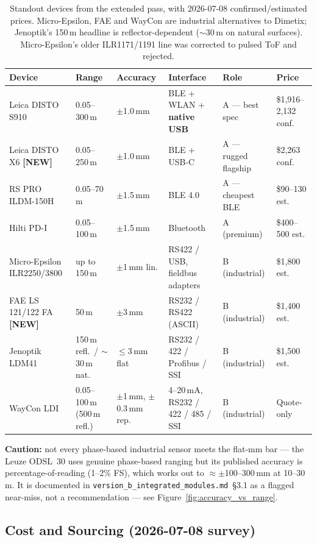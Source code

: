 \documentclass[11pt]{article}
\begin{document}
\begin{table}[htbp]
\centering
\small
\begin{tabular}{@{}p{2.4cm}p{1.7cm}p{1.4cm}p{2.8cm}p{2.0cm}p{2.0cm}@{}}
\toprule
\textbf{Device} & \textbf{Range} & \textbf{Accuracy} & \textbf{Interface} & \textbf{Role} & \textbf{Price} \\
\midrule
Leica DISTO S910 & 0.05--300\,m & $\pm$1.0\,mm & BLE + WLAN + \textbf{native USB} & A --- best spec & \$1{,}916--2{,}132 conf. \\
Leica DISTO X6 \textbf{[NEW]} & 0.05--250\,m & $\pm$1.0\,mm & BLE + USB-C & A --- rugged flagship & \$2{,}263 conf. \\
RS PRO ILDM-150H & 0.05--70\,m & $\pm$1.5\,mm & BLE 4.0 & A --- cheapest BLE & \$90--130 est. \\
Hilti PD-I & 0.05--100\,m & $\pm$1.5\,mm & Bluetooth & A (premium) & \$400--500 est. \\
Micro-Epsilon ILR2250/3800 & up to 150\,m & $\pm$1\,mm lin. & RS422 / USB, fieldbus adapters & B (industrial) & \$1{,}800 est. \\
FAE LS 121/122 FA \textbf{[NEW]} & 50\,m & $\pm$3\,mm & RS232 / RS422 (ASCII) & B (industrial) & \$1{,}400 est. \\
Jenoptik LDM41 & 150\,m refl.\ / $\sim$30\,m nat. & $\leq$3\,mm flat & RS232 / 422 / Profibus / SSI & B (industrial) & \$1{,}500 est. \\
WayCon LDI & 0.05--100\,m (500\,m refl.) & $\pm$1\,mm, $\pm$0.3\,mm rep. & 4--20\,mA, RS232 / 422 / 485 / SSI & B (industrial) & Quote-only \\
\bottomrule
\end{tabular}
\caption{Standout devices from the extended pass, with 2026-07-08 confirmed/estimated prices. Micro-Epsilon, FAE and WayCon are industrial alternatives to Dimetix; Jenoptik's 150\,m headline is reflector-dependent ($\sim$30\,m on natural surfaces). Micro-Epsilon's older ILR1171/1191 line was corrected to pulsed ToF and rejected.}
\end{table}

\textbf{Caution:} not every phase-based industrial sensor meets the flat-mm bar --- the Leuze ODSL~30 uses genuine phase-based ranging but its published accuracy is percentage-of-reading (1--2\% FS), which works out to $\approx\pm$100--300\,mm at 10--30\,m. It is documented in \texttt{version\_b\_integrated\_modules.md}~\S3.1 as a flagged near-miss, not a recommendation --- see Figure~\ref{fig:accuracy_vs_range}.

\subsection{Cost and Sourcing (2026-07-08 survey)}
\label{sec:sourcing}
\end{document}
